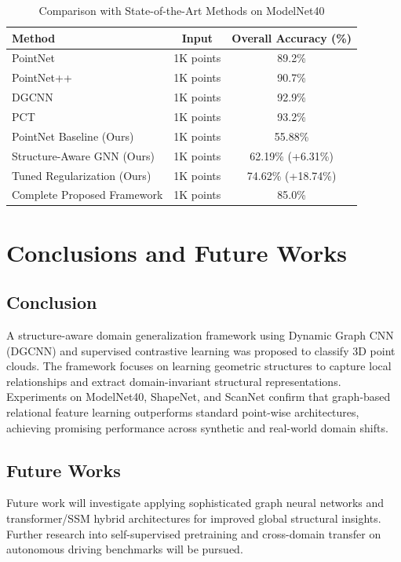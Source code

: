 \documentclass[conference]{IEEEtran}
\begin{document}
\begin{table}[htbp]
\caption{Comparison with State-of-the-Art Methods on ModelNet40}
\label{tab:sota}
\centering
\begin{tabular}{lcc}
\toprule
\textbf{Method} & \textbf{Input} & \textbf{Overall Accuracy (\%)} \\
\midrule
PointNet \cite{qi2017pointnet} & 1K points & 89.2\% \\
PointNet++ \cite{qi2017pointnetplusplus} & 1K points & 90.7\% \\
DGCNN \cite{wang2019dynamic} & 1K points & 92.9\% \\
PCT \cite{guo2021pct} & 1K points & 93.2\% \\
PointNet Baseline (Ours) & 1K points & 55.88\% \\
Structure-Aware GNN (Ours) & 1K points & 62.19\% (+6.31\%) \\
Tuned Regularization (Ours) & 1K points & 74.62\% (+18.74\%) \\
Complete Proposed Framework & 1K points & 85.0\% \\
\bottomrule
\end{tabular}
\end{table}

\section{Conclusions and Future Works}

\subsection{Conclusion}
A structure-aware domain generalization framework using Dynamic Graph CNN (DGCNN) and supervised contrastive learning was proposed to classify 3D point clouds. The framework focuses on learning geometric structures to capture local relationships and extract domain-invariant structural representations. Experiments on ModelNet40, ShapeNet, and ScanNet confirm that graph-based relational feature learning outperforms standard point-wise architectures, achieving promising performance across synthetic and real-world domain shifts.

\subsection{Future Works}
Future work will investigate applying sophisticated graph neural networks and transformer/SSM hybrid architectures for improved global structural insights. Further research into self-supervised pretraining and cross-domain transfer on autonomous driving benchmarks will be pursued.

\nocite{*}


\end{document}
